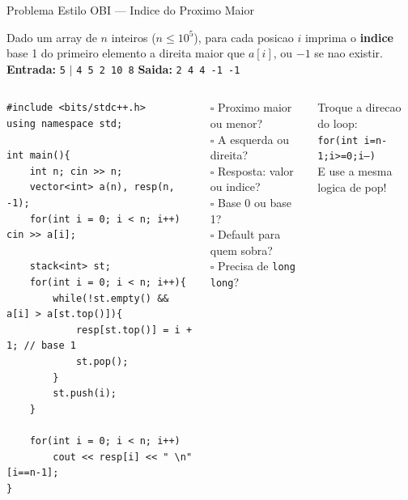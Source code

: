 \documentclass[aspectratio=169,11pt]{beamer}
\begin{document}
\begin{frame}[fragile,shrink=10]{Problema Estilo OBI --- Indice do Proximo Maior}
  \begin{tcolorbox}[caixaAzul,title={Enunciado}]
    \small
    Dado um array de $n$ inteiros ($n \le 10^5$), para cada posicao $i$
    imprima o \textbf{indice} base 1 do primeiro elemento a direita maior que $a[i]$,
    ou $-1$ se nao existir.\\[3pt]
    \textbf{Entrada:} \texttt{5} $|$ \texttt{4 5 2 10 8}
    \qquad
    \textbf{Saida:} \texttt{2 4 4 -1 -1}
  \end{tcolorbox}
  \vspace{0.05cm}
  \begin{columns}[t]
      \begin{tcolorbox}[caixaCodigo]
        \begin{lstlisting}[style=cppcompact]
#include <bits/stdc++.h>
using namespace std;

int main(){
    int n; cin >> n;
    vector<int> a(n), resp(n, -1);
    for(int i = 0; i < n; i++) cin >> a[i];

    stack<int> st;
    for(int i = 0; i < n; i++){
        while(!st.empty() && a[i] > a[st.top()]){
            resp[st.top()] = i + 1; // base 1
            st.pop();
        }
        st.push(i);
    }

    for(int i = 0; i < n; i++)
        cout << resp[i] << " \n"[i==n-1];
}
        \end{lstlisting}
      \end{tcolorbox}
      \begin{tcolorbox}[caixaAmarelo,title={Checklist antes de codar}]
        \footnotesize
        $\square$ Proximo maior ou menor?\\[3pt]
        $\square$ A esquerda ou direita?\\[3pt]
        $\square$ Resposta: valor ou indice?\\[3pt]
        $\square$ Base 0 ou base 1?\\[3pt]
        $\square$ Default para quem sobra?\\[3pt]
        $\square$ Precisa de \texttt{long long}?
      \end{tcolorbox}
      \vspace{0.12cm}
      \begin{tcolorbox}[caixaVerde,title={Anterior maior/menor}]
        \footnotesize
        Troque a direcao do loop:\\
        \texttt{for(int i=n-1;i>=0;i--)}\\[3pt]
        E use a mesma logica de pop!
      \end{tcolorbox}
  \end{columns}
\end{frame}
\end{document}
